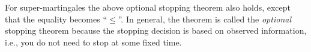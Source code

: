 \documentclass[11pt]{article}
\theoremstyle{plain}
\theoremstyle{definition}
\begin{document}

For super-martingales the above optional stopping theorem also holds, except that the equality becomes ``$\leq$''. In general, the theorem is called the \emph{optional} stopping theorem because the stopping decision is based on observed information, i.e., you do not need to stop at some fixed time.
\end{document}
